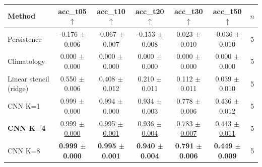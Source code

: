 \begin{tabular}{lcccccc}
\toprule
Method & acc\_t05 $\uparrow$ & acc\_t10 $\uparrow$ & acc\_t20 $\uparrow$ & acc\_t30 $\uparrow$ & acc\_t50 $\uparrow$ & $n$ \\
\midrule
Persistence & -0.176 $\pm$ 0.006 & -0.067 $\pm$ 0.007 & -0.153 $\pm$ 0.008 & 0.023 $\pm$ 0.010 & -0.036 $\pm$ 0.010 & 5 \\
Climatology & 0.000 $\pm$ 0.000 & 0.000 $\pm$ 0.000 & 0.000 $\pm$ 0.000 & 0.000 $\pm$ 0.000 & 0.000 $\pm$ 0.000 & 5 \\
Linear stencil (ridge) & 0.550 $\pm$ 0.006 & 0.408 $\pm$ 0.012 & 0.210 $\pm$ 0.011 & 0.112 $\pm$ 0.011 & 0.039 $\pm$ 0.010 & 5 \\
CNN K=1 & 0.999 $\pm$ 0.000 & 0.994 $\pm$ 0.000 & 0.934 $\pm$ 0.003 & 0.778 $\pm$ 0.006 & 0.436 $\pm$ 0.012 & 5 \\
\textbf{CNN K=4} & \underline{0.999 $\pm$ 0.000} & \underline{0.995 $\pm$ 0.001} & \underline{0.936 $\pm$ 0.004} & \underline{0.783 $\pm$ 0.007} & \underline{0.443 $\pm$ 0.011} & 5 \\
CNN K=8 & \textbf{0.999 $\pm$ 0.000} & \textbf{0.995 $\pm$ 0.001} & \textbf{0.940 $\pm$ 0.004} & \textbf{0.791 $\pm$ 0.006} & \textbf{0.449 $\pm$ 0.009} & 5 \\
\bottomrule
\end{tabular}
